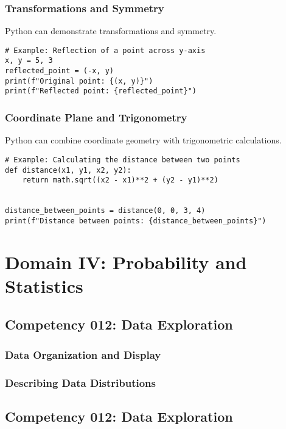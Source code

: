 \documentclass{book}
\begin{document}
\subsection{Transformations and Symmetry}
Python can demonstrate transformations and symmetry.


\begin{lstlisting}[style=pythonstyle]
# Example: Reflection of a point across y-axis
x, y = 5, 3
reflected_point = (-x, y)
print(f"Original point: {(x, y)}")
print(f"Reflected point: {reflected_point}")
\end{lstlisting}


\subsection{Coordinate Plane and Trigonometry}
Python can combine coordinate geometry with trigonometric calculations.


\begin{lstlisting}[style=pythonstyle]
# Example: Calculating the distance between two points
def distance(x1, y1, x2, y2):
    return math.sqrt((x2 - x1)**2 + (y2 - y1)**2)


distance_between_points = distance(0, 0, 3, 4)
print(f"Distance between points: {distance_between_points}")
\end{lstlisting}


\chapter{Domain IV: Probability and Statistics}

\section{Competency 012: Data Exploration}
\subsection{Data Organization and Display}
\subsection{Describing Data Distributions}


\section{Competency 012: Data Exploration}
\end{document}

